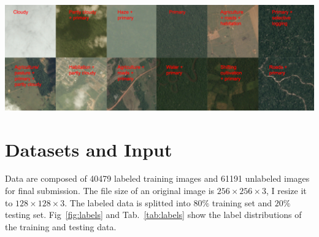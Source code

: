 \documentclass[11pt,oneside,a4paper]{article}
\newenvironment{Figure}
{\par\medskip\noindent\minipage{\linewidth}}
{\endminipage\par\medskip}
\begin{document}
\begin{Figure}
 \centering
 \includegraphics[width=0.75\linewidth, height=0.3\linewidth]{chips.jpg}
 \label{fig:sample}
\end{Figure}

\section{Datasets and Input}
\label{S:3}
Data\cite{amazonkaggle} are composed of 40479 labeled training images and 61191 unlabeled images for final submission. The file size of an original image is ${256\times 256 \times 3}$, I resize it to $128\times 128\times 3$.  The labeled data is splitted into $80\%$ training set and $20\%$ testing set. Fig~\ref{fig:labels} and Tab.~\ref{tab:labels} show the label distributions of the training and testing data.
\end{document}
